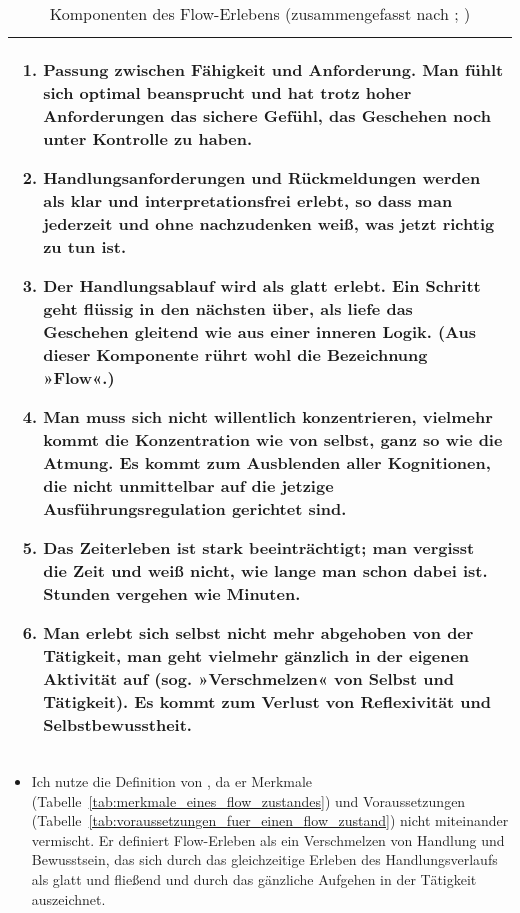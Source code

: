 \begin{table}
	[!htb] \caption[Komponenten des Flow-Erlebens]{Komponenten des Flow-Erlebens (zusammengefasst nach \citet{Csikszentmihalyi2010}; \citep[S.~153ff]{Rheinberg2008})} \label{tab:komponenten_des_flow_erlebens} 
	\begin{tabularx}
		{ 
		\textwidth}{X} \midrule \begin{enumerate}

	\item Passung zwischen Fähigkeit und Anforderung. Man fühlt sich optimal beansprucht und hat trotz hoher Anforderungen das sichere Gefühl, das Geschehen noch unter Kontrolle zu haben. 

			\item Handlungsanforderungen und Rückmeldungen werden als klar und interpretationsfrei erlebt, so dass man jederzeit und ohne nachzudenken weiß, was jetzt richtig zu tun ist. 

			\item Der Handlungsablauf wird als glatt erlebt. Ein Schritt geht flüssig in den nächsten über, als liefe das Geschehen gleitend wie aus einer inneren Logik. (Aus dieser Komponente rührt wohl die Bezeichnung »Flow«.) 

			\item Man muss sich nicht willentlich konzentrieren, vielmehr kommt die Konzentration wie von selbst, ganz so wie die Atmung. Es kommt zum Ausblenden aller Kognitionen, die nicht unmittelbar auf die jetzige Ausführungsregulation gerichtet sind. 

			\item Das Zeiterleben ist stark beeinträchtigt; man vergisst die Zeit und weiß nicht, wie lange man schon dabei ist. Stunden vergehen wie Minuten. 

			\item Man erlebt sich selbst nicht mehr abgehoben von der Tätigkeit, man geht vielmehr gänzlich in der eigenen Aktivität auf (sog. »Verschmelzen« von Selbst und Tätigkeit). Es kommt zum Verlust von Reflexivität und Selbstbewusstheit. 

\end{enumerate} \\

		\bottomrule 
	\end{tabularx}
\end{table}
\begin{itemize}
	
	\item Ich nutze die Definition von \citet{Henk2014}, da er Merkmale (Tabelle~\ref{tab:merkmale_eines_flow_zustandes}) und Voraussetzungen (Tabelle~\ref{tab:voraussetzungen_fuer_einen_flow_zustand}) nicht miteinander vermischt. Er definiert Flow-Erleben als ein Verschmelzen von Handlung und Bewusstsein, das sich durch das gleichzeitige Erleben des Handlungsverlaufs als glatt und fließend und durch das gänzliche Aufgehen in der Tätigkeit auszeichnet. 
\end{itemize}


